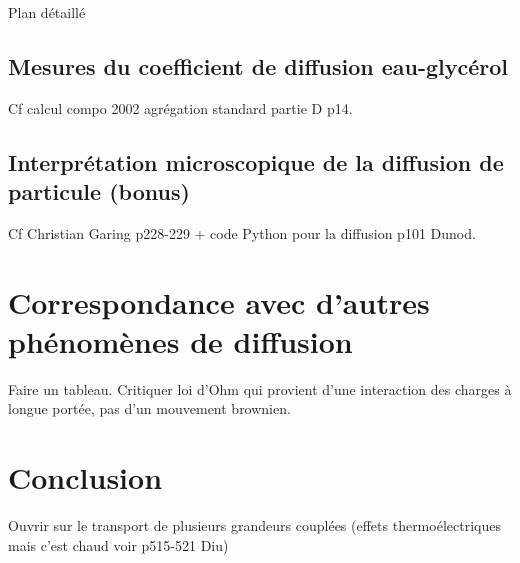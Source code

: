 \begin{reportBlock}{Plan détaillé}
\subsection{Mesures du coefficient de diffusion eau-glycérol}
Cf calcul compo 2002 agrégation standard partie D p14.

\subsection{Interprétation microscopique de la diffusion de particule (bonus)}
Cf Christian Garing p228-229 + code Python pour la diffusion p101 Dunod.

\section{Correspondance avec d'autres phénomènes de diffusion}

Faire un tableau. Critiquer loi d'Ohm qui provient d'une interaction des charges à longue portée, pas d'un mouvement brownien.

\section*{Conclusion}
Ouvrir sur le transport de plusieurs grandeurs couplées (effets thermoélectriques mais c'est chaud voir p515-521 Diu)
\end{reportBlock}